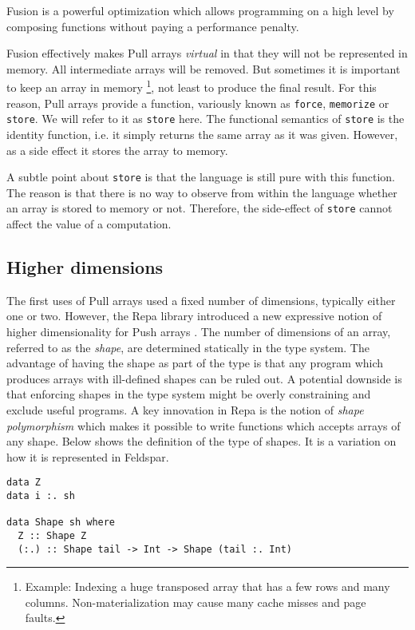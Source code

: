 \documentclass{sigplanconf}
\begin{document}
Fusion is a powerful optimization which allows programming on a high
level by composing functions without paying a performance penalty.

Fusion effectively makes Pull arrays \emph{virtual} in that they will
not be represented in memory. All intermediate arrays will be
removed. But sometimes it is important to keep an array in memory
\footnote{Example: Indexing a huge transposed array that has a few rows and many columns. Non-materialization
may cause many cache misses and page faults.}, 
not least to produce the final result. For this reason, Pull arrays
provide a function, variously known as \verb!force!, \verb!memorize!
  or \verb!store!. We will refer to it as \verb!store! here. The
  functional semantics of \verb!store! is the identity function,
  i.e. it simply returns the same array as it was given. However, as a
  side effect it stores the array to memory.

A subtle point about \verb!store! is that the language is still pure
with this function. The reason is that there is no way to observe from
within the language whether an array is stored to memory or
not. Therefore, the side-effect of \verb!store! cannot affect the
value of a computation.

\subsection{Higher dimensions}

The first uses of Pull arrays used a fixed number of dimensions,
typically either one or two. However, the Repa library introduced a
new expressive notion of higher dimensionality for Push arrays
\cite{keller2010regular}. The number of dimensions of an array, referred
to as the \emph{shape}, are determined statically in the type
system. The advantage of having the shape as part of the type is that
any program which produces arrays with ill-defined shapes can be ruled
out. A potential downside is that enforcing shapes in the type system might
be overly constraining and exclude useful programs. A key innovation in
Repa is the notion of \emph{shape polymorphism} which makes it
possible to write functions which accepts arrays of any shape. Below
shows the definition of the type of shapes. It is a variation on how
it is represented in Feldspar.

\begin{verbatim}
data Z
data i :. sh

data Shape sh where
  Z :: Shape Z
  (:.) :: Shape tail -> Int -> Shape (tail :. Int)
\end{verbatim}
\end{document}
